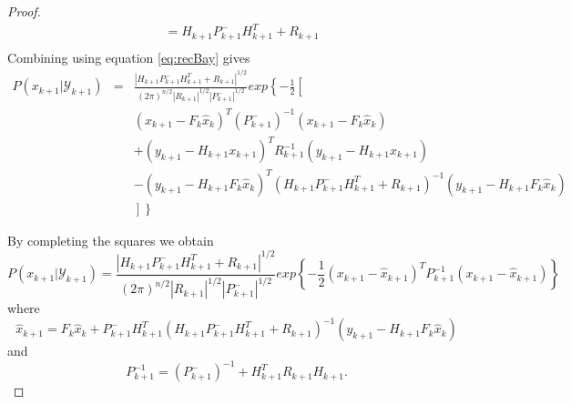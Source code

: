 \documentclass{article}
\theoremstyle{definition}
\theoremstyle{remark}
\newcommand{\filtrationObs}[1]{\ensuremath{\mathscr{Y}_{#1}}}
\begin{document}
\begin{proof}
\begin{align*}
&=H_{k+1}P^-_{k+1}H_{k+1}^T+R_{k+1}\\
\end{align*}
Combining using equation \eqref{eq:recBay} gives
\begin{eqnarray*}
P(x_{k+1}|\filtrationObs{k+1})&=& \frac{|H_{k+1}P^-_{k+1}H_{k+1}^T+R_{k+1}|^{1/2}}{(2\pi)^{n/2}|R_{k+1}|^{1/2}|P^-_{k+1}|^{1/2}}exp\left\{ -\frac{1}{2}\left[\right.\right.\\
&&(x_{k+1}-F_k\hat{x}_k)^T(P^-_{k+1})^{-1}(x_{k+1}-F_k\hat{x}_k)\\
&&+(y_{k+1}-H_{k+1}x_{k+1})^TR_{k+1}^{-1}(y_{k+1}-H_{k+1}x_{k+1})\\
&&-(y_{k+1}-H_{k+1}F_k\hat{x}_k)^T(H_{k+1}P^-_{k+1}H_{k+1}^T+R_{k+1})^{-1}(y_{k+1}-H_{k+1}F_k\hat{x}_k)\\
&& \left.\left.\right]\right\}
\end{eqnarray*}

By completing the squares we obtain
\begin{equation*}
P(x_{k+1}|\filtrationObs{k+1})=\frac{|H_{k+1}P^-_{k+1}H_{k+1}^T+R_{k+1}|^{1/2}}{(2\pi)^{n/2}|R_{k+1}|^{1/2}|P^-_{k+1}|^{1/2}}
exp\left\{ -\frac{1}{2}(x_{k+1}-\hat{x}_{k+1})^TP_{k+1}^{-1}(x_{k+1}-\hat{x}_{k+1})\right\}
\end{equation*}
where
\begin{equation*}
\hat{x}_{k+1}=F_k\hat{x}_k+P^-_{k+1}H_{k+1}^T(H_{k+1}P^-_{k+1}H_{k+1}^T+R_{k+1})^{-1}(y_{k+1}-H_{k+1}F_k\hat{x}_k)
\end{equation*}
and
\begin{equation*}
P_{k+1}^{-1}=(P^-_{k+1})^{-1}+H_{k+1}^TR_{k+1}H_{k+1}.
\end{equation*}


\end{proof}
\end{document}
